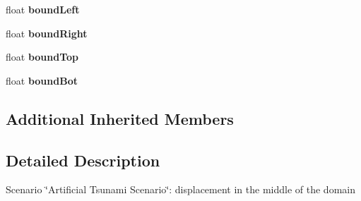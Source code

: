 \begin{DoxyCompactItemize}
\item 
\hypertarget{classSWE__TsunamiScenario_a37407bf93c1bec9831e1310e56b2e6ce}{float {\bfseries bound\-Left}}\label{classSWE__TsunamiScenario_a37407bf93c1bec9831e1310e56b2e6ce}

\item 
\hypertarget{classSWE__TsunamiScenario_a28d113f626aa4bad5eeb7118b421a797}{float {\bfseries bound\-Right}}\label{classSWE__TsunamiScenario_a28d113f626aa4bad5eeb7118b421a797}

\item 
\hypertarget{classSWE__TsunamiScenario_a3699f9cf07990269de1db072ec9d3d92}{float {\bfseries bound\-Top}}\label{classSWE__TsunamiScenario_a3699f9cf07990269de1db072ec9d3d92}

\item 
\hypertarget{classSWE__TsunamiScenario_ac2f354deabb9d24b994eea25e168eef0}{float {\bfseries bound\-Bot}}\label{classSWE__TsunamiScenario_ac2f354deabb9d24b994eea25e168eef0}

\end{DoxyCompactItemize}
\subsection*{Additional Inherited Members}


\subsection{Detailed Description}
Scenario \char`\"{}\-Artificial Tsunami Scenario\char`\"{}\-: displacement in the middle of the domain 

